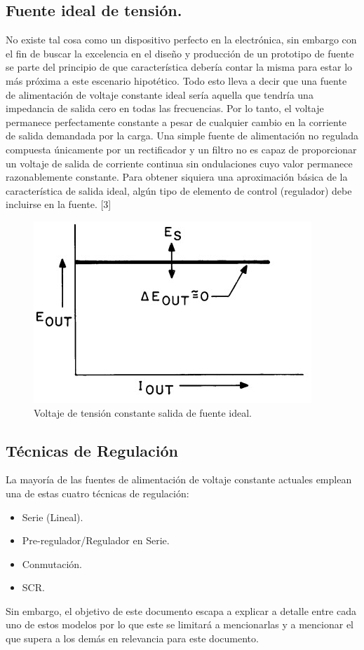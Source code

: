 \subsection{Fuente ideal de  tensión.}
No existe tal cosa como un dispositivo perfecto en la electrónica, sin embargo con el fin de buscar la excelencia en el diseño y producción de un prototipo de fuente se parte del principio de que característica debería contar la misma para estar lo más próxima a este escenario hipotético. Todo esto lleva a decir que una fuente de alimentación de voltaje constante ideal sería aquella que tendría una impedancia de salida cero en todas las frecuencias. Por lo tanto, el voltaje permanece perfectamente constante a pesar de cualquier cambio en la corriente de salida demandada por la carga.
Una simple fuente de alimentación no regulada compuesta únicamente por un rectificador y un filtro no es capaz de proporcionar un voltaje de salida de corriente continua sin ondulaciones cuyo valor permanece razonablemente constante. Para obtener siquiera una aproximación básica de la característica de salida ideal, algún tipo de elemento de control (regulador) debe incluirse en la fuente. [3]

\begin{figure}
    \centering
    \includegraphics[scale=0.4]{./imagenes/salidaidealfuentedc.jpg}
    \caption{Voltaje de tensión constante salida de fuente ideal.}
    \label{F:estructura_archivos}
\end{figure}

\subsection{Técnicas de Regulación}
La mayoría de las fuentes de alimentación de voltaje constante actuales emplean una de estas cuatro técnicas de regulación:
\begin{itemize}
    \item Serie (Lineal).
    \item Pre-regulador/Regulador en Serie.
    \item Conmutación.
    \item SCR.
\end{itemize}
Sin embargo, el objetivo de este documento escapa a explicar a detalle entre cada uno de estos modelos por lo que este se limitará a mencionarlas y a mencionar el que supera a los demás en relevancia para este documento. 
